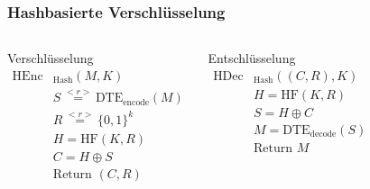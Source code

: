 \begin{frame}[c]
	\frametitle{Hashbasierte Verschlüsselung}
	
	\begin{columns}
		Verschlüsselung
		\begin{align*}
			\text{HEnc}&_{\text{Hash}}(M, K)\\
			&S \overset{<r>}{=} \text{DTE}_{\text{encode}}(M)\\ 	%
			&R \overset{<r>}{=} \{0,1\}^k\\	%
			&H = \text{HF}(K,R)\\	%
			&C = H \oplus S\\	%
			&\text{Return } (C,R)
		\end{align*}
		
		\pause

		Entschlüsselung
		\begin{align*}
			\text{HDec}&_{\text{Hash}}((C,R), K)\\
			&H = \text{HF}(K,R)\\	%
			&S = H \oplus C\\	%
			&M = \text{DTE}_{\text{decode}}(S)\\ 	%
			&\text{Return } M
		\end{align*}
	\end{columns}
\end{frame}